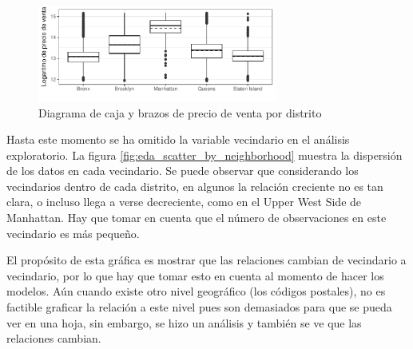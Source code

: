\begin{figure}[H]
    \centering
    \includegraphics[width=0.7\textwidth]{images/eda_boxplot_price_borough.pdf}
    \caption{Diagrama de caja y brazos de precio de venta por distrito}
    \label{fig:eda_boxplot_price_borough}
\end{figure}

 

Hasta este momento se ha omitido la variable vecindario en el análisis exploratorio. La figura \ref{fig:eda_scatter_by_neighborhood} muestra la dispersión de los datos en cada vecindario. Se puede observar que considerando los vecindarios dentro de cada distrito, en algunos la relación creciente no es tan clara, o incluso llega a verse decreciente, como en el Upper West Side de Manhattan. Hay que tomar en cuenta que el número de observaciones en este vecindario es más pequeño. %

El propósito de esta gráfica es mostrar que las relaciones cambian de vecindario a vecindario, por lo que hay que tomar esto en cuenta al momento de hacer los modelos. Aún cuando existe otro nivel geográfico (los códigos postales), no es factible graficar la relación a este nivel pues son demasiados para que se pueda ver en una hoja, sin embargo, se hizo un análisis y también se ve que las relaciones cambian.

